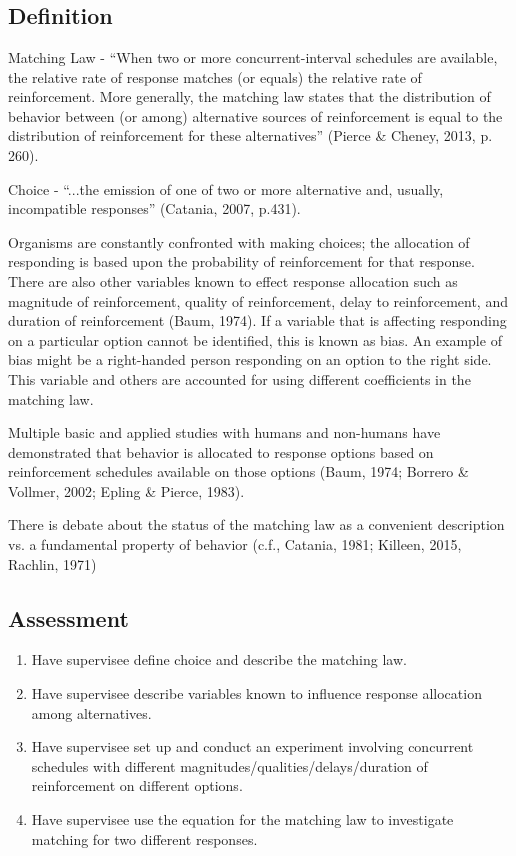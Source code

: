 \clearpage \section[\foureEight{}]{\foureEight{}%
              }
\subsection{Definition} 
Matching Law - ``When two or more concurrent-interval schedules are available, the relative rate of response matches (or equals) the relative rate of reinforcement. More generally, the matching law states that the distribution of behavior between (or among) alternative sources of reinforcement is equal to the distribution of reinforcement for these alternatives'' (Pierce \& Cheney, 2013, p. 260).

Choice - ``...the emission of one of two or more alternative and, usually, incompatible responses'' (Catania, 2007, p.431).

Organisms are constantly confronted with making choices; the allocation of responding is based upon the probability of reinforcement for that response. There are also other variables known to effect response allocation such as magnitude of reinforcement, quality of reinforcement, delay to reinforcement, and duration of reinforcement (Baum, 1974). If a variable that is affecting responding on a particular option cannot be identified, this is known as bias. An example of bias might be a right-handed person responding on an option to the right side. This variable and others are accounted for using different coefficients in the matching law.

Multiple basic and applied studies with humans and non-humans have demonstrated that behavior is allocated to response options based on reinforcement schedules available on those options (Baum, 1974; Borrero \& Vollmer, 2002; Epling \& Pierce, 1983).

There is debate about the status of the matching law as a convenient description vs. a fundamental property of behavior (c.f., Catania, 1981; Killeen, 2015, Rachlin, 1971)
%
\subsection{Assessment}
\begin{enumerate}
\item Have supervisee define choice and describe the matching law.
\item Have supervisee describe variables known to influence response allocation among alternatives.
\item Have supervisee set up and conduct an experiment involving concurrent schedules with different magnitudes/qualities/delays/duration of reinforcement on different options.
\item Have supervisee use the equation for the matching law to investigate matching for two different responses.
%
\end{enumerate}
%
